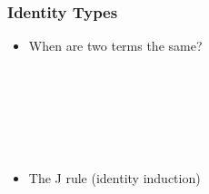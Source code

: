 \begin{frame}
\frametitle{Identity Types}
\begin{itemize}
\item When are two terms the same?
\begin{code}%
\>[0]\AgdaSpace{}%
\AgdaSpace{}%
\AgdaSymbol{\{}\AgdaSpace{}%
\AgdaSymbol{:}\AgdaSpace{}%
\AgdaSymbol{\}}\AgdaSpace{}%
\AgdaSymbol{(}\AgdaSpace{}%
\AgdaSymbol{:}\AgdaSpace{}%
\AgdaSymbol{)}\AgdaSpace{}%
\AgdaSymbol{:}\AgdaSpace{}%
\AgdaSpace{}%
\AgdaSpace{}%
\AgdaSpace{}%
\<%
\\
\>[0][@{}l@{\AgdaIndent{0}}]%
\>[2]\AgdaSpace{}%
\AgdaSymbol{:}\AgdaSpace{}%
\AgdaSpace{}%
\AgdaSpace{}%
\<%
\\
%
\\[\AgdaEmptyExtraSkip]%
\>[0]\AgdaFunction{\AgdaUnderscore{}}\AgdaSpace{}%
\AgdaSymbol{:}\AgdaSpace{}%
\AgdaSpace{}%
\AgdaSymbol{(}\AgdaSpace{}%
\AgdaSymbol{)}\AgdaSpace{}%
\<%
\\
\>[0]\AgdaSymbol{\AgdaUnderscore{}}\AgdaSpace{}%
\AgdaSymbol{=}\AgdaSpace{}%
\<%
\\
\>[0]\<%
\end{code}
\item The J rule (identity induction)
\begin{code}%
\>[0]\AgdaSpace{}%
\AgdaSymbol{:}%
\>[233I]\AgdaSymbol{\{}\AgdaSpace{}%
\AgdaSymbol{:}\AgdaSpace{}%
\AgdaSymbol{\}}\AgdaSpace{}%
\AgdaSymbol{\{}\AgdaSpace{}%
\AgdaSymbol{:}\AgdaSpace{}%
\AgdaSymbol{\}}\AgdaSpace{}%
\<%
\\
\>[.][@{}l@{}]\<[233I]%
\>[4]\AgdaSymbol{(}\AgdaSpace{}%
\AgdaSymbol{:}\AgdaSpace{}%
\AgdaSymbol{(}\AgdaSpace{}%
\AgdaSymbol{:}\AgdaSpace{}%
\AgdaSymbol{)}\AgdaSpace{}%
\AgdaSpace{}%
\AgdaSymbol{(}\AgdaSpace{}%
\AgdaSpace{}%
\AgdaSymbol{)}\AgdaSpace{}%
\AgdaSpace{}%
\AgdaSymbol{)}\AgdaSpace{}%
\<%
\\
%
\>[4]\AgdaSymbol{(}\AgdaSpace{}%
\AgdaSymbol{:}\AgdaSpace{}%
\AgdaSpace{}%

\end{code}
\end{itemize}
\end{frame}
